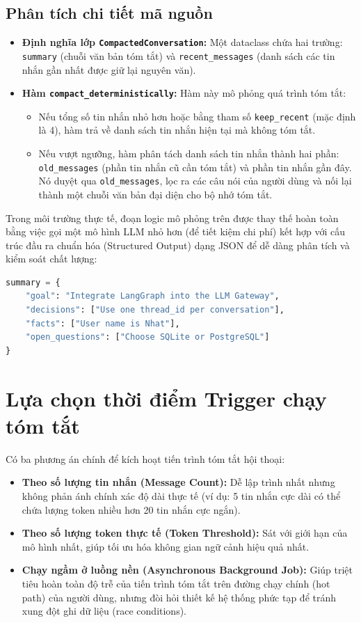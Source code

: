 \subsection{Phân tích chi tiết mã nguồn}
\begin{itemize}
  \item \textbf{Định nghĩa lớp \texttt{CompactedConversation}:} Một dataclass chứa hai trường: \texttt{summary} (chuỗi văn bản tóm tắt) và \texttt{recent\_messages} (danh sách các tin nhắn gần nhất được giữ lại nguyên văn).
  \item \textbf{Hàm \texttt{compact\_deterministically}:} Hàm này mô phỏng quá trình tóm tắt:
  \begin{itemize}
    \item Nếu tổng số tin nhắn nhỏ hơn hoặc bằng tham số \texttt{keep\_recent} (mặc định là 4), hàm trả về danh sách tin nhắn hiện tại mà không tóm tắt.
    \item Nếu vượt ngưỡng, hàm phân tách danh sách tin nhắn thành hai phần: \texttt{old\_messages} (phần tin nhắn cũ cần tóm tắt) và phần tin nhắn gần đây. Nó duyệt qua \texttt{old\_messages}, lọc ra các câu nói của người dùng và nối lại thành một chuỗi văn bản đại diện cho bộ nhớ tóm tắt.
  \end{itemize}
\end{itemize}

Trong môi trường thực tế, đoạn logic mô phỏng trên được thay thế hoàn toàn bằng việc gọi một mô hình LLM nhỏ hơn (để tiết kiệm chi phí) kết hợp với cấu trúc đầu ra chuẩn hóa (Structured Output) dạng JSON để dễ dàng phân tích và kiểm soát chất lượng:

\begin{lstlisting}[language=Python,caption={Schema summary dễ đánh giá}]
summary = {
    "goal": "Integrate LangGraph into the LLM Gateway",
    "decisions": ["Use one thread_id per conversation"],
    "facts": ["User name is Nhat"],
    "open_questions": ["Choose SQLite or PostgreSQL"]
}
\end{lstlisting}

\section{Lựa chọn thời điểm Trigger chạy tóm tắt}

Có ba phương án chính để kích hoạt tiến trình tóm tắt hội thoại:
\begin{itemize}
  \item \textbf{Theo số lượng tin nhắn (Message Count):} Dễ lập trình nhất nhưng không phản ánh chính xác độ dài thực tế (ví dụ: 5 tin nhắn cực dài có thể chứa lượng token nhiều hơn 20 tin nhắn cực ngắn).
  \item \textbf{Theo số lượng token thực tế (Token Threshold):} Sát với giới hạn của mô hình nhất, giúp tối ưu hóa không gian ngữ cảnh hiệu quả nhất.
  \item \textbf{Chạy ngầm ở luồng nền (Asynchronous Background Job):} Giúp triệt tiêu hoàn toàn độ trễ của tiến trình tóm tắt trên đường chạy chính (hot path) của người dùng, nhưng đòi hỏi thiết kế hệ thống phức tạp để tránh xung đột ghi dữ liệu (race conditions).
\end{itemize}

